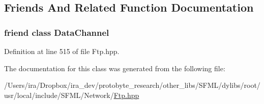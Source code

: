 \subsection{Friends And Related Function Documentation}
\hypertarget{classsf_1_1_ftp_a8dee57337b6a7e183bfe21d178757b0c}{
\subsubsection[{Data\-Channel}]{\setlength{\rightskip}{0pt plus 5cm}friend class Data\-Channel\hspace{0.3cm}{\ttfamily [friend]}}}\label{classsf_1_1_ftp_a8dee57337b6a7e183bfe21d178757b0c}


Definition at line 515 of file Ftp.\-hpp.



The documentation for this class was generated from the following file\-:\begin{DoxyCompactItemize}
\item 
/\-Users/ira/\-Dropbox/ira\-\_\-dev/protobyte\-\_\-research/other\-\_\-libs/\-S\-F\-M\-L/dylibs/root/usr/local/include/\-S\-F\-M\-L/\-Network/\hyperlink{_ftp_8hpp}{Ftp.\-hpp}\end{DoxyCompactItemize}
